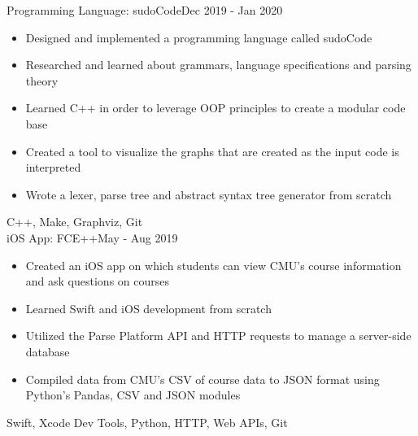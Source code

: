 %
%
%


\begin{projects}

    \project
	{Programming Language: sudoCode}{Dec 2019 - Jan 2020}
	{
	    \begin{itemize}
            \item Designed and implemented a programming language called sudoCode
            \item Researched and learned about grammars, language specifications and parsing theory
            \item Learned C++ in order to leverage OOP principles to create a modular code base
            \item Created a tool to visualize the graphs that are created as the input code is interpreted
            \item Wrote a lexer, parse tree and abstract syntax tree generator from scratch
        \end{itemize}
    }
	{C++, Make, Graphviz, Git} \\

	\project
	{iOS App: FCE++}{May - Aug 2019}
	{
	    \begin{itemize}
            \item Created an iOS app on which students can view CMU’s course information and ask questions on courses
            \item Learned Swift and iOS development from scratch
            \item Utilized the Parse Platform API and HTTP requests to manage a server-side database
            \item Compiled data from CMU’s CSV of course data to JSON format using Python’s Pandas, CSV and JSON modules
        \end{itemize}
    }
    {Swift, Xcode Dev Tools, Python, HTTP, Web APIs, Git}

\end{projects}
